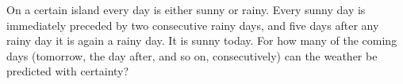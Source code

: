 On a certain island every day is either sunny or rainy. Every sunny day is immediately preceded by two consecutive rainy days, and five days after any rainy day it is again a rainy day. It is sunny today. For how many of the coming days (tomorrow, the day after, and so on, consecutively) can the weather be predicted with certainty?
